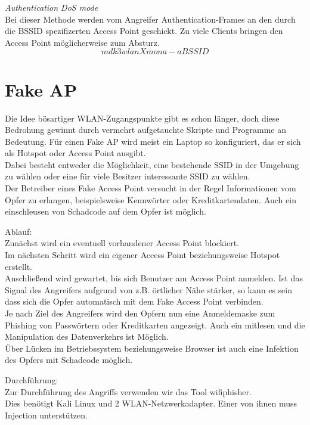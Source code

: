 \textit{Authentication DoS mode}\\
Bei dieser Methode werden vom Angreifer Authentication-Frames an den durch die BSSID spezifizerten Access Point geschickt. Zu viele Clients bringen den Access Point möglicherweise zum Absturz. 
$$mdk3 wlanXmon a -a BSSID$$


\section{Fake AP}
Die Idee bösartiger WLAN-Zugangspunkte gibt es schon länger, doch diese Bedrohung gewinnt durch vermehrt aufgetauchte Skripte und Programme an Bedeutung. Für einen Fake AP wird meist ein Laptop so konfiguriert, das er sich als Hotspot oder Access Point ausgibt.\\ Dabei besteht entweder die Möglichkeit, eine bestehende SSID in der Umgebung zu wählen oder eine für viele Besitzer interessante SSID zu wählen. \\

Der Betreiber eines Fake Access Point versucht in der Regel Informationen vom Opfer zu erlangen, beispielsweise Kennwörter oder Kreditkartendaten. Auch ein einschleusen von Schadcode auf dem Opfer ist möglich. 

Ablauf: \\

Zunächst wird ein eventuell vorhandener Access Point blockiert. \\ 
Im nächsten Schritt wird ein eigener Access Point beziehungsweise Hotspot erstellt. \\
Anschließend wird gewartet, bis sich Benutzer am Access Point anmelden. Ist das Signal des Angreifers aufgrund von z.B. örtlicher Nähe stärker, so kann es sein dass sich die Opfer automatisch mit dem Fake Access Point verbinden. \\
Je nach Ziel des Angreifers wird den Opfern nun eine Anmeldemaske zum Phishing von Passwörtern oder Kreditkarten angezeigt. 
Auch ein mitlesen und die Manipulation 	  des Datenverkehrs ist Möglich. \\ Über Lücken im Betriebssystem beziehungsweise Browser ist auch eine Infektion des Opfers mit Schadcode möglich. 

Durchführung: \\

Zur Durchführung des Angriffs verwenden wir das Tool wifiphisher.\\ 

Dies benötigt Kali Linux und 2 WLAN-Netzwerkadapter. Einer von ihnen muss Injection unterstützen. \\


